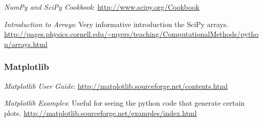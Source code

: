 \noindent \emph{NumPy and SciPy Cookbook}: \url{http://www.scipy.org/Cookbook}

\noindent \emph{Introduction to Arrays}: Very informative introduction the SciPy arrays. \url{http://pages.physics.cornell.edu/~myers/teaching/ComputationalMethods/python/arrays.html}

\subsubsection*{Matplotlib}
\noindent \emph{Matplotlib User Guide}: \url{http://matplotlib.sourceforge.net/contents.html}

\noindent \emph{Matplotlib Examples}: Useful for seeing the python code that generate certain plots. \url{http://matplotlib.sourceforge.net/examples/index.html}



